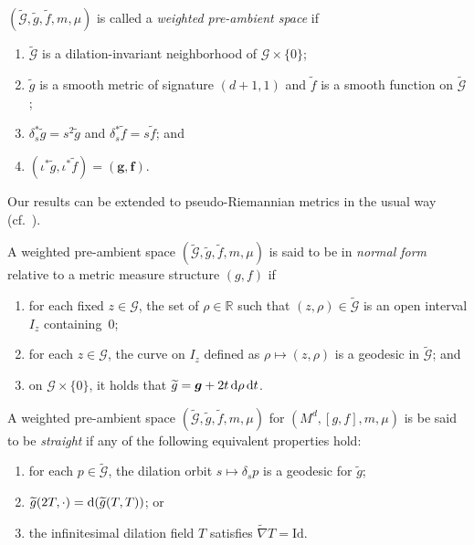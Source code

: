 \documentclass[pdftex]{sigma}
\newcommand{\cg}{\widetilde{g}}
\newcommand{\cf}{\widetilde{f}}
\newcommand{\cmG}{\widetilde{\mathcal{G}}}
\newcommand{\mG}{\mathcal{G}}
\newcommand{\bR}{\mathbb{R}}
\numberwithin{equation}{section}
\begin{document}
\begin{Definition}
$(\cmG,\cg,\cf,m,\mu)$ is called a \emph{weighted pre-ambient space} if
\begin{enumerate}[label=$(\roman*)$]\itemsep=0pt
 \item $\cmG$ is a dilation-invariant neighborhood of $\mG\times \{0\}$;
 \item $\cg$ is a smooth metric of signature $(d+1,1)$ and $\widetilde{f}$ is a smooth function on $\cmG$;
 \item $\delta_s^*\widetilde{g}=s^2 \widetilde{g}$ and $\delta_s^*\widetilde{f}=s\widetilde{f}$; and
 \item $(\iota^*\widetilde{g},\iota^*\widetilde{f})=(\boldsymbol{g},\boldsymbol{f})$.
\end{enumerate}
\end{Definition}

\begin{Remark}
Our results can be extended to pseudo-Riemannian metrics in the usual way (cf.~\cite{FeffermanGraham2012}).
\end{Remark}

\begin{Definition}
A weighted pre-ambient space $(\cmG,\cg,\cf,m,\mu)$ is said to be in \emph{normal form} relative to a metric measure structure $(g,f)$ if
\begin{enumerate}[label=$(\roman*)$]\itemsep=0pt
 \item for each fixed $z\in\mG$, the set of $\rho\in\bR$ such that $(z,\rho)\in \cmG$ is an open interval $I_z$ containing~$0$;
 \item for each $z\in\mG$, the curve on $I_z$ defined as $\rho\mapsto(z,\rho)$ is a geodesic in $\cmG$; and
 \item on $\mG\times \{0\}$, it holds that $\cg=\boldsymbol{g} + 2t\,{\rm d}\rho\,\mathrm{d}t$.
\end{enumerate}
\end{Definition}

\begin{Definition}
A weighted pre-ambient space $(\cmG,\cg,\cf,m,\mu)$ for $(M^d,[g,f],m,\mu)$ is be said to be \textit{straight} if any of the following equivalent properties hold:
\begin{enumerate}[label=$(\roman*)$]\itemsep=0pt
 \item for each $p\in \widetilde{\mathcal{G}}$, the dilation orbit $s\mapsto \delta_s p$ is a geodesic for $\widetilde{g}$;

 \item $\widetilde{g}(2T,\cdot)={\rm d}(\widetilde{g}(T,T))$; or

\item the infinitesimal dilation field $T$ satisfies $\widetilde{\nabla}T=\mathrm{Id}$.
\end{enumerate}
\end{Definition}
\end{document}
